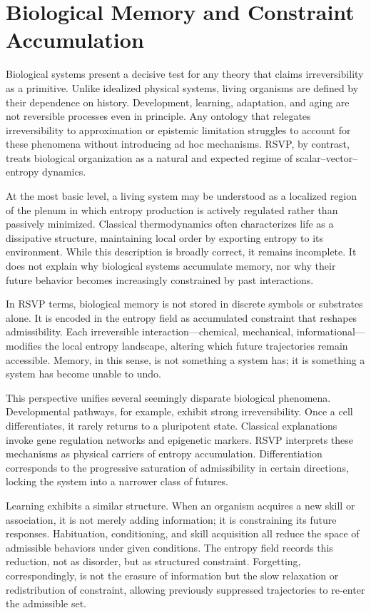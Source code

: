 \documentclass[11pt,oneside]{book}
\begin{document}
\chapter{Biological Memory and Constraint Accumulation}

Biological systems present a decisive test for any theory that claims irreversibility as a primitive. Unlike idealized physical systems, living organisms are defined by their dependence on history. Development, learning, adaptation, and aging are not reversible processes even in principle. Any ontology that relegates irreversibility to approximation or epistemic limitation struggles to account for these phenomena without introducing ad hoc mechanisms. RSVP, by contrast, treats biological organization as a natural and expected regime of scalar–vector–entropy dynamics.

At the most basic level, a living system may be understood as a localized region of the plenum in which entropy production is actively regulated rather than passively minimized. Classical thermodynamics often characterizes life as a dissipative structure, maintaining local order by exporting entropy to its environment. While this description is broadly correct, it remains incomplete. It does not explain why biological systems accumulate memory, nor why their future behavior becomes increasingly constrained by past interactions.

In RSVP terms, biological memory is not stored in discrete symbols or substrates alone. It is encoded in the entropy field as accumulated constraint that reshapes admissibility. Each irreversible interaction—chemical, mechanical, informational—modifies the local entropy landscape, altering which future trajectories remain accessible. Memory, in this sense, is not something a system has; it is something a system has become unable to undo.

This perspective unifies several seemingly disparate biological phenomena. Developmental pathways, for example, exhibit strong irreversibility. Once a cell differentiates, it rarely returns to a pluripotent state. Classical explanations invoke gene regulation networks and epigenetic markers. RSVP interprets these mechanisms as physical carriers of entropy accumulation. Differentiation corresponds to the progressive saturation of admissibility in certain directions, locking the system into a narrower class of futures.

Learning exhibits a similar structure. When an organism acquires a new skill or association, it is not merely adding information; it is constraining its future responses. Habituation, conditioning, and skill acquisition all reduce the space of admissible behaviors under given conditions. The entropy field records this reduction, not as disorder, but as structured constraint. Forgetting, correspondingly, is not the erasure of information but the slow relaxation or redistribution of constraint, allowing previously suppressed trajectories to re-enter the admissible set.
\end{document}
